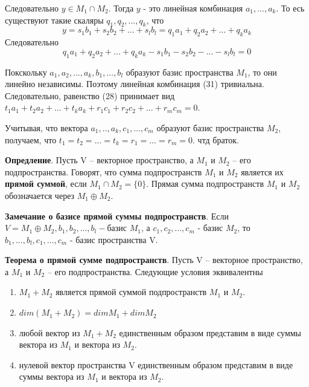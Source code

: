 \documentclass[a4paper]{article}
\begin{document}
\begin{hproof}
Следовательно $y \in M_1 \cap M_2$. Тогда $y$ - это линейная комбинация $a_1, ..., a_k$. То есь существуют такие скаляры $q_1, q_2, ..., q_k$, что 
\begin{equation}
y = s_1b_1+s_2b_2+...+s_lb_l = q_1a_1 + q_2a_2 + ... + q_ka_k
\end{equation}
Следовательно 
\begin{equation}
q_1a_1 + q_2a_2 + ... + q_ka_k - s_1b_1 - s_2b_2-... - s_lb_l = 0
\end{equation}

Покскольку $a_1, a_2, ..., a_k, b_1, ..., b_l$ образуют базис пространства $M_1$, то они линейно независимы. Поэтому линейная комбинация (31) тривиальна. Следовательно, равенство (28) принимает вид $t_1a_1 +t_2a_2 + ... + t_ka_k +r_1c_1 + r_2c_2 + ... + r_mc_m = 0$.

Учитывая, что вектора $a_1, .., a_k, c_1, ..., c_m$ образуют базис пространства $M_2$, получаем, что $t_1 = t_2 = ... = t_k = r_1 = ... = r_m = 0$. чтд браток.
\end{hproof}

\newpage \begin{center}\begin{Large}\end{Large}\end{center}

\textbf{Опредление}. Пусть V – векторное пространство, а $M_1$ и $M_2$ – его подпространства.
Говорят, что сумма подпространств $M_1$ и $M_2$ является их \textbf{прямой суммой},
если $M_1 \cap M_2 =\{ 0 \}$. Прямая сумма подпространств $M_1$ и $M_2$
обозначается через $M_1 \oplus M_2$. 

\begin{htheorem}
\textbf{Замечание о базисе прямой суммы подпространств}. Если $V = M_1 \oplus M_2, b_1, b_2, ..., b_l - $базис $M_1$, а $c_1, c_2, ..., c_m$ - базис $M_2$, то $b_1, ..., b_l, c_1, ..., c_m$ - базис пространства V.
\end{htheorem}

\begin{htheorem}
\textbf{Теорема о прямой сумме подпространств}. Пусть V – векторное пространство, а $M_1$ и $M_2$ – его подпространства. Следующие условия эквивалентны \begin{enumerate}
\item $M_1 + M_2$ является прямой суммой подпространств $M_1$ и $M_2$.
\item $dim(M_1+M_2) = dim M_1 + dim M_2$
\item любой вектор из $M_1+M_2$ единственным образом представим в виде суммы вектора из $M_1$ и вектора из $M_2$.
\item нулевой вектор пространства V единственным образом представим в виде суммы вектора из $M_1$ и вектора из $M_2$.
\end{enumerate}
\end{htheorem}
\end{document}
